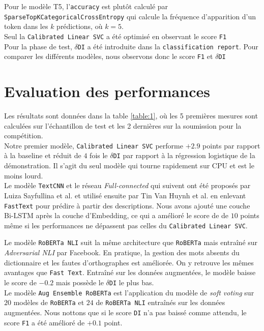 Pour le modèle T5, l'\texttt{accuracy} est plutôt calculé par \texttt{SparseTopKCategoricalCrossEntropy} qui calcule la fréquence d'apparition d'un token dans les $k$ prédictions, où $k = 5$.\\
Seul la \texttt{Calibrated Linear SVC} a été optimisé en observant le score \texttt{F1}
\hfill\\

Pour la phase de test, $\delta$\texttt{DI} a été introduite dans la \texttt{classification report}. Pour comparer les différents modèles, nous observons donc le score \texttt{F1} et $\delta$\texttt{DI}

\section{Evaluation des performances}
Les résultats sont données dans la table \ref{table:1}, où les 5 premières mesures sont calculées sur l'échantillon de test et les 2 dernières sur la soumission pour la compétition.
\hfill\\

Notre premier modèle, \texttt{Calibrated Linear SVC} performe $+2.9$ points par rapport à la baseline et réduit de $4$ fois le $\delta$\texttt{DI} par rapport à la régression logistique de la démonstration. Il s'agit du seul modèle qui tourne rapidement sur CPU et est le moins lourd.
\hfill\\

Le modèle \texttt{TextCNN} et le réseau \textit{Full-connected} qui suivent ont été proposés par Luiza Sayfullina et al. et utilisé ensuite par Tin Van Huynh et al. en enlevant \texttt{FastText} pour prédire à partir des descriptions. Nous avons ajouté une couche Bi-LSTM après la couche d'Embedding, ce qui a amélioré le score de de $10$ points même si les performances ne dépassent pas celles du \texttt{Calibrated Linear SVC}.

Le modèle \texttt{RoBERTa NLI} suit la même architecture que \texttt{RoBERTa} mais entraîné sur \textit{Adversarial NLI} par Facebook. En pratique, la gestion des mots absents du dictionnaire et les fautes d'orthographes est améliorée. On y retrouve les mêmes avantages que \texttt{Fast Text}. Entraîné sur les données augmentées, le modèle baisse le score de $-0.2$ mais possède le $\delta$\texttt{DI} le plus bas.\\
Le modèle \texttt{Aug Ensemble RoBERTa} est l'application du modèle de \textit{soft voting} sur $20$ modèles de \texttt{RoBERTa} et $24$ de \texttt{RoBERTa NLI} entraînés sur les données augmentées. Nous nottons que si le score \texttt{DI} n'a pas baissé comme attendu, le score \texttt{F1} a été amélioré de $+0.1$ point.
\hfill\\

